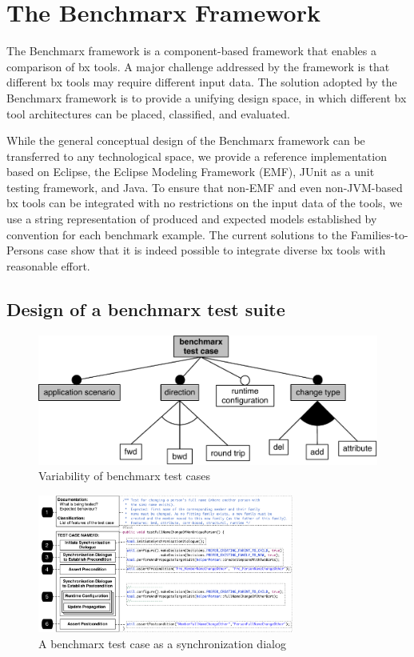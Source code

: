 \section{The Benchmarx Framework}
\label{sec:Benchmarx}

The Benchmarx framework is a component-based framework that enables a comparison of bx tools. 
A major challenge addressed by the framework is that different bx tools may require different input data. 
The solution adopted by the Benchmarx framework is to provide a unifying design space, in which different bx tool architectures can be placed, classified, and evaluated. 

While the general conceptual design of the Benchmarx framework can be transferred to any technological space, we provide a reference implementation based on Eclipse, the Eclipse Modeling Framework (EMF), JUnit as a unit testing framework, and Java.
To ensure that non-EMF and even non-JVM-based bx tools can be integrated with no restrictions on the input data of the tools, we use a string representation of produced and expected models established by convention for each benchmark example.
The current solutions to the Families-to-Persons case show that it is indeed possible to integrate diverse bx tools with reasonable effort.

\subsection{Design of a benchmarx test suite}
\label{sec:DesignOfABenchmarxTestSuite}

\begin{figure}[t!]
	\centering
	\includegraphics[width=\columnwidth]{diagrams/framework/feature-model-benchmarx-test-case}
	\caption{Variability of benchmarx test cases}
	\label{fig:featureModelBenchmarxTestCase}
\end{figure}

\begin{figure}[tb]
	\centering
	\includegraphics[width=0.75\textwidth]{diagrams/benchmarx/testCase}
	\caption{A benchmarx test case as a synchronization dialog}
	\label{fig:benchmarxTestCase}
\end{figure}

